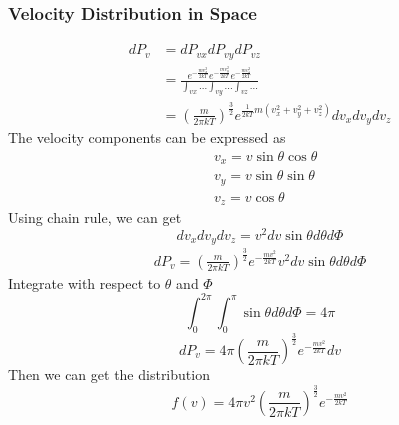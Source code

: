 \documentclass[letterpaper]{article}
\begin{document}
\subsubsection*{Velocity Distribution in Space}
\begin{equation*}
    \begin{aligned}
        dP_v & =dP_{vx}dP_{vy}dP_{vz}                                                             \\
             & =\frac{e^{-\frac{mv_x^2}{2kT}}e^{-\frac{mv_y^2}{2kT}}e^{-\frac{mv_z^2}{2kT}}}
        {\int_{vx}...\int_{vy}...\int_{vz}...}                                                    \\
             & =\left(\frac{m}{2\pi kT}\right)^{\frac{3}{2}}e^{\frac{1}{2kT}m(v_x^2+v_y^2+v_z^2)}
        dv_xdv_ydv_z
    \end{aligned}
\end{equation*}
The velocity components can be expressed as
\begin{equation*}
    \begin{aligned}
         & v_x=v\sin\theta\cos\theta \\
         & v_y=v\sin\theta\sin\theta \\
         & v_z=v\cos\theta
    \end{aligned}
\end{equation*}
Using chain rule, we can get
\begin{equation*}
    dv_xdv_ydv_z=v^2dv\sin\theta d\theta d\Phi
\end{equation*}
\begin{equation*}
    \begin{aligned}
        dP_v=\left(\frac{m}{2\pi kT}\right)^{\frac{3}{2}}e^{-\frac{mv^2}{2kT}}v^2dv\sin\theta d\theta d\Phi
    \end{aligned}
\end{equation*}
Integrate with respect to $\theta$ and $\Phi$
\begin{equation*}
    \int_{0}^{2\pi}\int_{0}^{\pi}\sin\theta d\theta d\Phi=4\pi
\end{equation*}
\begin{equation*}
    dP_v=4\pi\left(\frac{m}{2\pi kT}\right)^{\frac{3}{2}}e^{-\frac{mv^2}{2kT}}dv
\end{equation*}
Then we can get the distribution
\begin{equation*}
    f(v)=4\pi v^2\left(\frac{m}{2\pi kT}\right)^{\frac{3}{2}}e^{-\frac{mv^2}{2kT}}
\end{equation*}
\end{document}
